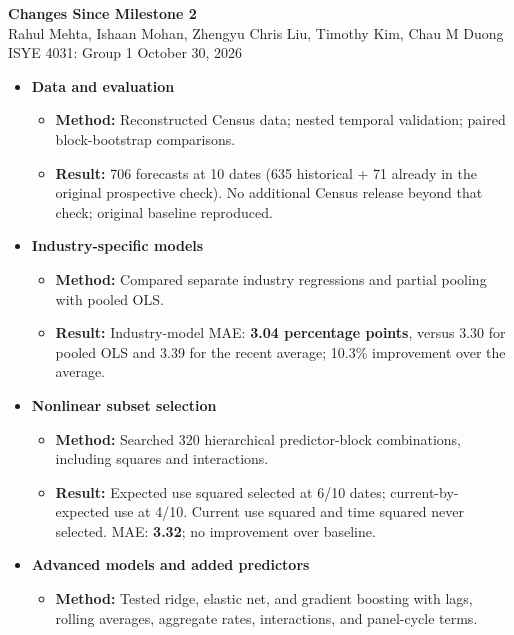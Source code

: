 \documentclass[10pt]{article}
\begin{document}
\begin{center}
{\Large\bfseries Changes Since Milestone 2}\\[5pt]
{\small Rahul Mehta, Ishaan Mohan, Zhengyu Chris Liu, Timothy Kim, Chau M Duong}\\[2pt]
{\small ISYE 4031: Group 1 \quad October 30, 2026}
\end{center}
\begin{itemize}
\setlength{\itemsep}{5pt}
\setlength{\parsep}{0pt}
\item \textbf{Data and evaluation}
  \begin{itemize}\setlength{\itemsep}{0pt}
  \item \textbf{Method:} Reconstructed Census data; nested temporal validation; paired block-bootstrap comparisons.
  \item \textbf{Result:} 706 forecasts at 10 dates (635 historical + 71 already in the original prospective check). No additional Census release beyond that check; original baseline reproduced.
  \end{itemize}
\item \textbf{Industry-specific models}
  \begin{itemize}\setlength{\itemsep}{0pt}
  \item \textbf{Method:} Compared separate industry regressions and partial pooling with pooled OLS.
  \item \textbf{Result:} Industry-model MAE: \textbf{3.04 percentage points}, versus 3.30 for pooled OLS and 3.39 for the recent average; 10.3\% improvement over the average.
  \end{itemize}
\item \textbf{Nonlinear subset selection}
  \begin{itemize}\setlength{\itemsep}{0pt}
  \item \textbf{Method:} Searched 320 hierarchical predictor-block combinations, including squares and interactions.
  \item \textbf{Result:} Expected use squared selected at 6/10 dates; current-by-expected use at 4/10. Current use squared and time squared never selected. MAE: \textbf{3.32}; no improvement over baseline.
  \end{itemize}
\item \textbf{Advanced models and added predictors}
  \begin{itemize}\setlength{\itemsep}{0pt}
  \item \textbf{Method:} Tested ridge, elastic net, and gradient boosting with lags, rolling averages, aggregate rates, interactions, and panel-cycle terms.

\end{itemize}
\end{itemize}
\end{document}

